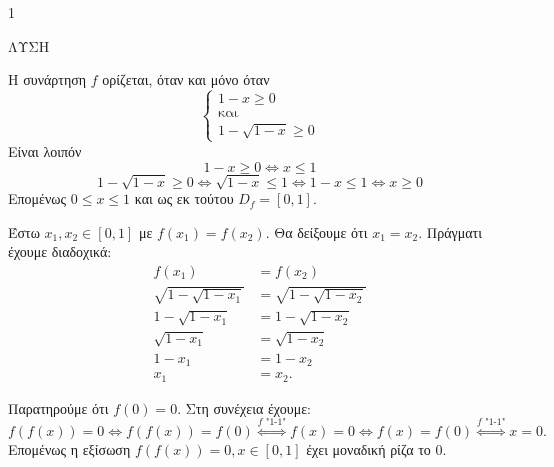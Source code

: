 \begin{ylh}{1}
    \item [Ύλη από εικόνα]
\end{ylh}
ΛΥΣΗ

\begin{alist}
    \item[α)] Η συνάρτηση $f$ ορίζεται, όταν και μόνο όταν
    \[
        \begin{cases}
            1 - x \ge 0 \\
            \text{και} \\
            1 - \sqrt{1 - x} \ge 0
        \end{cases}
    \]
    Είναι λοιπόν
    \[
        1 - x \ge 0 \Leftrightarrow x \le 1
    \]
    \[
        1 - \sqrt{1 - x} \ge 0 \Leftrightarrow \sqrt{1 - x} \le 1 \Leftrightarrow 1 - x \le 1 \Leftrightarrow x \ge 0
    \]
    Επομένως $0 \le x \le 1$ και ως εκ τούτου $D_f = [0,1]$.

    \item[β)]
    \begin{rlist}
        \item Έστω $x_1,x_2 \in [0,1]$ με $f(x_1) = f(x_2)$. Θα δείξουμε ότι $x_1 = x_2$. Πράγματι έχουμε διαδοχικά:
        \begin{align*}
            f(x_1) &= f(x_2) \\
            \sqrt{1-\sqrt{1-x_1}} &= \sqrt{1-\sqrt{1-x_2}} \\
            1-\sqrt{1-x_1} &= 1-\sqrt{1-x_2} \\
            \sqrt{1-x_1} &= \sqrt{1-x_2} \\
            1-x_1 &= 1-x_2 \\
            x_1 &= x_2 \text{.}
        \end{align*}
        \item Παρατηρούμε ότι $f(0) = 0$. Στη συνέχεια έχουμε:
        \[
            f(f(x)) = 0 \Leftrightarrow f(f(x)) = f(0) \overset{f \text{ "1-1"}}{\Longleftrightarrow} f(x) = 0 \Leftrightarrow f(x) = f(0) \overset{f \text{ "1-1"}}{\Longleftrightarrow} x = 0 \text{.}
        \]
        Επομένως η εξίσωση $f(f(x)) = 0, x \in [0,1]$ έχει μοναδική ρίζα το $0$.
    \end{rlist}
\end{alist}